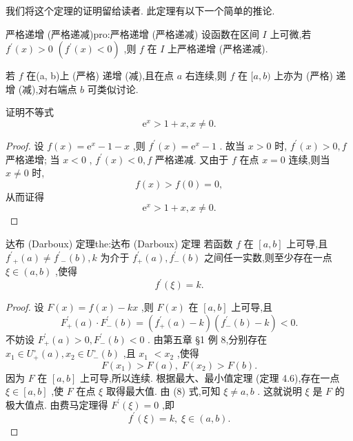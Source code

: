 我们将这个定理的证明留给读者. 此定理有以下一个简单的推论.

\begin{corollary}{严格递增 (严格递减)}{pro:严格递增 (严格递减)}
设函数在区间 \(I\) 上可微,若 \({f}^{\prime }\left( x\right)  > 0\)  \(\left( {{f}^{\prime }\left( x\right)  < 0}\right)\) ,则 \(f\) 在 \(I\) 上严格递增 (严格递减).
\end{corollary}


\begin{remark}
若 \(f\) 在(a, b)上 (严格) 递增 (减),且在点 \(a\) 右连续,则 \(f\) 在 \(\lbrack a,b)\) 上亦为 (严格) 递增 (减),对右端点 \(b\) 可类似讨论.

\end{remark}

\begin{example}
证明不等式
\[
{\mathrm{e}}^{x} > 1 + x,x \neq  0.
\]
\end{example}

\begin{proof}
设 \(f\left( x\right)  = {\mathrm{e}}^{x} - 1 - x\) ,则 \({f}^{\prime }\left( x\right)  = {\mathrm{e}}^{x} - 1\) . 故当 \(x > 0\) 时, \({f}^{\prime }\left( x\right)  > 0,f\) 严格递增; 当 \(x < 0\) , \({f}^{\prime }\left( x\right)  < 0,f\) 严格递减. 又由于 \(f\) 在点 \(x = 0\) 连续,则当 \(x \neq  0\) 时,
\[
f\left( x\right)  > f\left( 0\right)  = 0,
\]
从而证得
\[
{\mathrm{e}}^{x} > 1 + x,x \neq  0.
\]
\end{proof}

\begin{theorem}{达布 (Darboux) 定理}{the:达布 (Darboux) 定理}
若函数 \(f\) 在 \(\left\lbrack  {a,b}\right\rbrack\) 上可导,且 \({f}^{\prime }{}_{ + }\left( a\right)  \neq  {f}^{\prime }{}_{ - }\left( b\right) ,k\) 为介于 \({f}_{ + }^{\prime }\left( a\right) ,{f}_{ - }^{\prime }\left( b\right)\) 之间任一实数,则至少存在一点 \(\xi  \in  \left( {a,b}\right)\) ,使得
\[
{f}^{\prime }\left( \xi \right)  = k.
\]
\end{theorem}

\begin{proof}
设 \(F\left( x\right)  = f\left( x\right)  - {kx}\) ,则 \(F\left( x\right)\) 在 \(\left\lbrack  {a,b}\right\rbrack\) 上可导,且
\[
{F}_{ + }^{\prime }\left( a\right)  \cdot  {F}_{ - }^{\prime }\left( b\right)  = \left( {{f}_{ + }^{\prime }\left( a\right)  - k}\right) \left( {{f}_{ - }^{\prime }\left( b\right)  - k}\right)  < 0.
\]
不妨设 \({F}_{ + }^{\prime }\left( a\right)  > 0,{F}_{ - }^{\prime }\left( b\right)  < 0\) . 由第五章 §1 例 8,分别存在 \({x}_{1} \in  {U}_{ + }^{ \circ  }\left( a\right) ,{x}_{2} \in  {U}_{ - }^{ \circ  }\left( b\right)\) ,且 \({x}_{1}\)  \(< {x}_{2}\) ,使得
\[
F\left( {x}_{1}\right)  > F\left( a\right) ,\;F\left( {x}_{2}\right)  > F\left( b\right) . \tag{8}
\]
因为 \(F\) 在 \(\left\lbrack  {a,b}\right\rbrack\) 上可导,所以连续. 根据最大、最小值定理 (定理 4.6),存在一点 \(\xi  \in  \left\lbrack  {a,b}\right\rbrack\) ,使 \(F\) 在点 \(\xi\) 取得最大值. 由 (8) 式,可知 \(\xi  \neq  a,b\) . 这就说明 \(\xi\) 是 \(F\) 的极大值点. 由费马定理得 \({F}^{\prime }\left( \xi \right)  = 0\) ,即
\[
{f}^{\prime }\left( \xi \right)  = k,\;\xi  \in  \left( {a,b}\right) .
\]
\end{proof}

